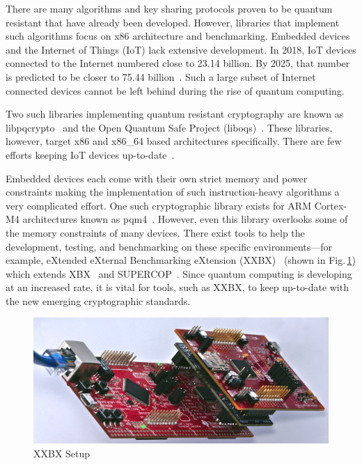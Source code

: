 \documentclass[10pt]{article}
\begin{document}
There are many algorithms and key sharing protocols proven to be quantum resistant that have 
already been developed. However, libraries that implement such algorithms focus on x86 
architecture and benchmarking. Embedded devices and the Internet of Things (IoT) lack extensive 
development. In 2018, IoT devices connected to the Internet numbered close to 23.14 billion. 
By 2025, that number is predicted to be closer to 75.44 billion~\cite{2610}.
Such a large subset of Internet 
connected devices cannot be left behind during the rise of quantum computing.

Two such libraries implementing quantum resistant cryptography are known as libpqcrypto~\cite{libpqcrypto} 
and the Open Quantum Safe Project (liboqs)~\cite{openquantumsave}. These libraries, however, target 
x86 and x86\_64 based architectures specifically. There are few efforts keeping IoT devices 
up-to-date~\cite{MALINA2018462}.

Embedded devices each come with their own strict memory and power constraints making the 
implementation of such instruction-heavy algorithms a very complicated effort. One such 
cryptographic library exists for ARM Cortex-M4 architectures known as pqm4~\cite{PQM4}. 
However, even this library overlooks some of the memory constraints of many devices. 
There exist tools to help the development, testing, and benchmarking on these specific 
environments—for example, eXtended eXternal Benchmarking eXtension (XXBX)~\cite{PK15,Kap16}
(shown in Fig.\,\ref{fig:xxbx_setup}) which extends 
XBX~\cite{xbx} and SUPERCOP~\cite{SUP06}.  Since quantum computing is developing at an increased rate, 
it is vital for tools, such as XXBX, to keep up-to-date with the 
new emerging cryptographic standards.

\begin{figure}[ht]
    \centering
    \includegraphics[scale=1.0]{../figures/xxbx-tilted}
    \caption{XXBX Setup}
    \label{fig:xxbx_setup}
\end{figure}
\end{document}
